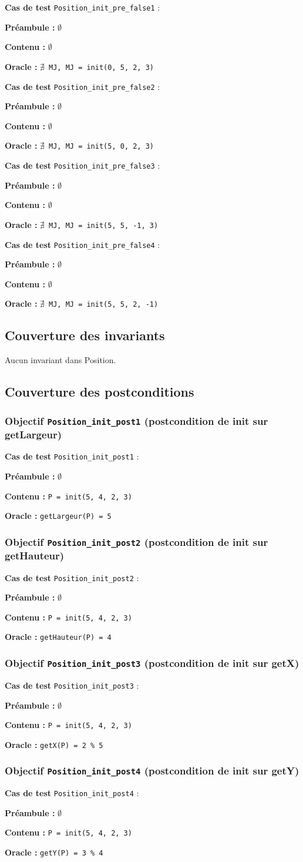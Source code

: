 \documentclass{article}
\newcommand{\cmd}[1]{\texttt{#1}}
\newcommand{\lNEXISTS}{$\nexists{}$}
\newcommand{\obj}[2]{\subsubsection*{\large{\textbf{Objectif {\cmd{#1} (#2)}}}}}
\newenvironment{cas}[1]
{
	\hspace{1em}\textbf{Cas de test} \cmd{#1} :
	\begin{list}{}{}
}{
	\end{list}\vspace{1em}
}
\newcommand{\npre}{\item \textbf{Préambule :} $\emptyset$}
\newcommand{\ope}[1]{\item \textbf{Contenu :} \cmd{#1}}
\newcommand{\nope}{\item \textbf{Contenu :} $\emptyset$}
\newcommand{\ora}[1]{\item \textbf{Oracle :} \cmd{#1}}
\begin{document}
	\begin{cas}{Position\_init\_pre\_false1}
		\npre{}
		\nope{}
		\ora{\lNEXISTS{} MJ, MJ = init(0, 5, 2, 3)}
	\end{cas}

	\begin{cas}{Position\_init\_pre\_false2}
		\npre{}
		\nope{}
		\ora{\lNEXISTS{} MJ, MJ = init(5, 0, 2, 3)}
	\end{cas}

	\begin{cas}{Position\_init\_pre\_false3}
		\npre{}
		\nope{}
		\ora{\lNEXISTS{} MJ, MJ = init(5, 5, -1, 3)}
	\end{cas}

	\begin{cas}{Position\_init\_pre\_false4}
		\npre{}
		\nope{}
		\ora{\lNEXISTS{} MJ, MJ = init(5, 5, 2, -1)}
	\end{cas}


\subsection{Couverture des invariants}

Aucun invariant dans Position.

\subsection{Couverture des postconditions}

\obj{Position\_init\_post1} {postcondition de init sur getLargeur}
	\begin{cas} {Position\_init\_post1}
		\npre{}
		\ope{P = init(5, 4, 2, 3)}
		\ora{getLargeur(P) = 5}
	\end{cas}

\obj{Position\_init\_post2} {postcondition de init sur getHauteur}
	\begin{cas} {Position\_init\_post2}
		\npre{}
		\ope{P = init(5, 4, 2, 3)}
		\ora{getHauteur(P) = 4}
	\end{cas}


\obj{Position\_init\_post3} {postcondition de init sur getX}
	\begin{cas} {Position\_init\_post3}
		\npre{}
		\ope{P = init(5, 4, 2, 3)}
		\ora{getX(P) = 2 \% 5}
	\end{cas}

\obj{Position\_init\_post4} {postcondition de init sur getY}
	\begin{cas} {Position\_init\_post4}
		\npre{}
		\ope{P = init(5, 4, 2, 3)}
		\ora{getY(P) = 3 \% 4}
	\end{cas}
\end{document}
